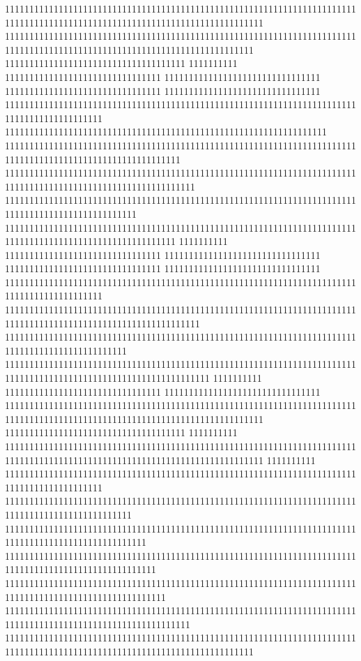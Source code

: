 11111111111111111111111111111111111111111111111111111111111111111111111111111111111111111111111111111111111111111111111111111
111111111111111111111111111111111111111111111111111111111111111111111111111111111111111111111111111111111111111111111111111
1111111111111111111111111111111111111
1111111111
11111111111111111111111111111111
11111111111111111111111111111111
11111111111111111111111111111111
11111111111111111111111111111111
11111111111111111111111111111111111111111111111111111111111111111111111111111111111111111111
111111111111111111111111111111111111111111111111111111111111111111
111111111111111111111111111111111111111111111111111111111111111111111111111111111111111111111111111111111111
111111111111111111111111111111111111111111111111111111111111111111111111111111111111111111111111111111111111111
111111111111111111111111111111111111111111111111111111111111111111111111111111111111111111111111111
11111111111111111111111111111111111111111111111111111111111111111111111111111111111111111111111111111111111
1111111111
11111111111111111111111111111111
11111111111111111111111111111111
11111111111111111111111111111111
11111111111111111111111111111111
11111111111111111111111111111111111111111111111111111111111111111111111111111111111111111111
1111111111111111111111111111111111111111111111111111111111111111111111111111111111111111111111111111111111111111
1111111111111111111111111111111111111111111111111111111111111111111111111111111111111111111111111
111111111111111111111111111111111111111111111111111111111111111111111111111111111111111111111111111111111111111111
1111111111
11111111111111111111111111111111
11111111111111111111111111111111
11111111111111111111111111111111111111111111111111111111111111111111111111111111111111111111111111111111111111111111111111111
1111111111111111111111111111111111111
1111111111
11111111111111111111111111111111111111111111111111111111111111111111111111111111111111111111111111111111111111111111111111111
1111111111
11111111111111111111111111111111111111111111111111111111111111111111111111111111111111111111
11111111111111111111111111111111111111111111111111111111111111111111111111111111111111111111111111
11111111111111111111111111111111111111111111111111111111111111111111111111111111111111111111111111111
1111111111111111111111111111111111111111111111111111111111111111111111111111111111111111111111111111111
111111111111111111111111111111111111111111111111111111111111111111111111111111111111111111111111111111111
11111111111111111111111111111111111111111111111111111111111111111111111111111111111111111111111111111111111111
111111111111111111111111111111111111111111111111111111111111111111111111111111111111111111111111111111111111111111111111111
